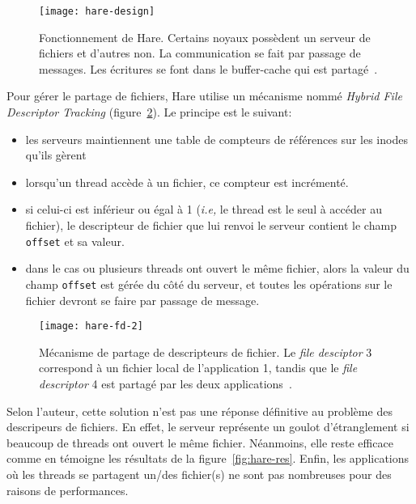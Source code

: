      \begin{figure}[ht]
        \centering
        \texttt{[image: hare-design]}
        \caption{Fonctionnement de Hare. Certains noyaux possèdent un serveur de
          fichiers et d'autres non. La communication se fait par passage de
          messages. Les écritures se font dans le buffer-cache qui est
          partagé~\citep{gruenwald2014providing}.}
        \label{fig:hare-design}
      \end{figure}

      Pour gérer le partage de fichiers, Hare utilise un mécanisme nommé
      \textit{Hybrid File Descriptor Tracking} (figure~\ref{fig:hare-fd}). Le
      principe est le suivant:
      \begin{itemize}
        \item les serveurs maintiennent une table de compteurs de références sur
          les inodes qu'ils gèrent
        \item lorsqu'un thread accède à un fichier, ce compteur est incrémenté.
        \item si celui-ci est inférieur ou égal à 1 (\textit{i.e,} le thread est
          le seul à accéder au fichier), le descripteur de fichier que lui
          renvoi le serveur contient le champ \texttt{offset} et sa valeur.
        \item dans le cas ou plusieurs threads ont ouvert le même fichier, alors
          la valeur du champ \texttt{offset} est gérée du côté du serveur, et
          toutes les opérations sur le fichier devront se faire par passage de
          message.
      \end{itemize}
      \begin{figure}[ht]
        \centering
        \texttt{[image: hare-fd-2]}
        \caption{Mécanisme de partage de descripteurs de fichier. Le
          \textit{file desciptor} 3 correspond à un fichier local de
          l'application 1, tandis que le \textit{file descriptor} 4 est partagé
          par les deux applications~\citep{gruenwald2014providing}.}
        \label{fig:hare-fd}
      \end{figure}

      Selon l'auteur, cette solution n'est pas une réponse définitive au
      problème des descripeurs de fichiers. En effet, le serveur représente un
      goulot d'étranglement si beaucoup de threads ont ouvert le même
      fichier. Néanmoins, elle reste efficace comme en témoigne les résultats de
      la figure~\ref{fig:hare-res}. Enfin, les applications où les threads se
      partagent un/des fichier(s) ne sont pas nombreuses pour des raisons de
      performances.\\


